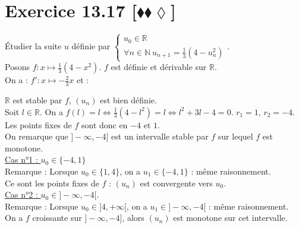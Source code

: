 \documentclass[10pt]{article}
\begin{document}
\section*{Exercice 13.17 [$\blacklozenge\blacklozenge\lozenge$]}
\begin{tcolorbox}[enhanced, width=7.6in, center, size=fbox, fontupper=\large, drop shadow southwest]
    Étudier la suite $u$ définie par $\begin{cases}
        u_0 \in \mathbb{R}\\
        \forall n \in \mathbb{N} ~ u_{n+1} = \frac{1}{3}(4-u_n^2)
    \end{cases}$.\\
    Posons $f:x\mapsto \frac{1}{3}(4-x^2)$. $f$ est définie et dérivable sur $\mathbb{R}$.\\
    On a : $f':x\mapsto -\frac{2}{3}x$ et :
    \begin{center}
    \end{center}
    $\mathbb{R}$ est stable par $f$, $(u_n)$ est bien définie.\\
    Soit $l\in\mathbb{R}$. On a $f(l)=l \iff \frac{1}{3}(4-l^2) = l \iff l^2 + 3l - 4 = 0$. $r_1 = 1$, $r_2 = -4$.\\
    Les points fixes de $f$ sont donc en $-4$ et $1$.\\
    On remarque que $]-\infty, -4]$ est un intervalle stable par $f$ sur lequel $f$ est monotone.\\[0.2cm]
    \underline{Cas n°1 : $u_0 \in \{-4,1\}$}\\
    Remarque : Lorsque $u_0 \in \{1,4\}$, on a $u_1 \in \{-4,1\}$ : même raisonnement.\\
    Ce sont les points fixes de $f$ : $(u_n)$ est convergente vers $u_0$.\\[0.4cm]
    \underline{Cas n°2 : $u_0 \in ]-\infty, -4[$}.\\
    Remarque : Lorsque $u_0\in]4,+\infty[$, on a $u_1\in]-\infty, -4[$ : même raisonnement.\\
    On a $f$ croissante sur $]-\infty,-4]$, alors $(u_n)$ est monotone sur cet intervalle.\\

\end{tcolorbox}
\end{document}
